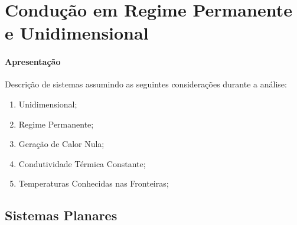 \documentclass{article}
\begin{document}
    \section{Condução em Regime Permanente e Unidimensional}
        \paragraph{Apresentação}Descrição de sistemas assumindo as seguintes considerações durante a análise:
            \begin{enumerate}[noitemsep]
                \item Unidimensional;
                \item Regime Permanente;
                \item Geração de Calor Nula;
                \item Condutividade Térmica Constante;
                \item Temperaturas Conhecidas nas Fronteiras;
            \end{enumerate}

        \subsection{Sistemas Planares}
\end{document}
